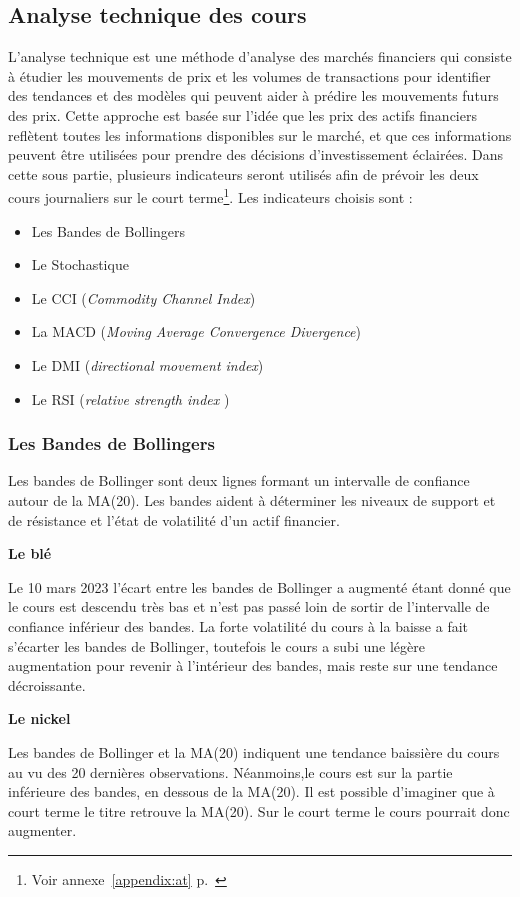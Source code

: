 \subsection{Analyse technique des cours}
L'analyse technique est une méthode d'analyse des marchés financiers qui consiste à étudier les mouvements de prix et les volumes de transactions pour identifier des 
tendances et des modèles qui peuvent aider à prédire les mouvements futurs des prix. Cette approche est basée sur l'idée que les prix des actifs financiers reflètent 
toutes les informations disponibles sur le marché, et que ces informations peuvent être utilisées pour prendre des décisions d'investissement éclairées. Dans cette sous
partie, plusieurs indicateurs seront utilisés afin de prévoir les deux cours journaliers sur le court 
terme\footnote{Voir annexe~\ref{appendix:at} p.~\pageref{appendix:at}}. Les indicateurs choisis sont :
\begin{itemize}
    \item Les Bandes de Bollingers
    \item Le Stochastique
    \item Le CCI (\textit{Commodity Channel Index})
    \item La MACD (\textit{Moving Average Convergence Divergence})
    \item Le DMI (\textit{directional movement index})
    \item Le RSI (\textit{relative strength index} )
\end{itemize}


\subsubsection*{Les Bandes de Bollingers}
Les bandes de Bollinger sont deux lignes formant un intervalle de confiance autour de la MA(20). Les bandes aident à déterminer les niveaux de support et de résistance et 
l'état de volatilité d'un actif financier.
\begin{multicols}{2}
\centerline{\textbf{Le blé}}
Le 10 mars 2023 l'écart entre les bandes de Bollinger a augmenté étant donné que le cours est descendu très bas et n'est pas passé loin de sortir de l'intervalle 
de confiance inférieur des bandes. La forte volatilité du cours à la baisse a fait s'écarter les bandes de Bollinger, toutefois le cours a subi une légère augmentation 
pour revenir à l'intérieur des bandes, mais reste sur une tendance décroissante. 

\columnbreak
\centerline{\textbf{Le nickel}}
Les bandes de Bollinger et la MA(20) indiquent une tendance baissière du cours au vu des 20 dernières observations. Néanmoins,le cours est sur la partie inférieure des bandes, en dessous de la MA(20). Il est possible d'imaginer que à court terme le titre retrouve la MA(20). Sur le court terme le cours pourrait donc augmenter.
\end{multicols}

